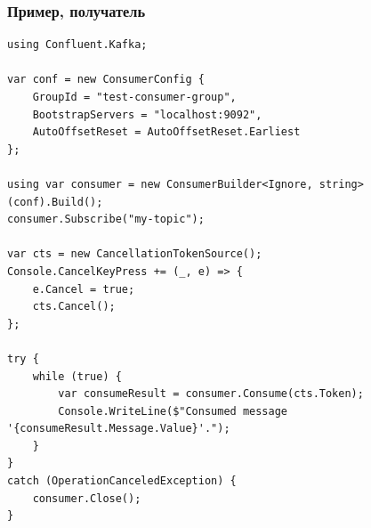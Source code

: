 \documentclass[xetex,mathserif,serif]{beamer}
\begin{document}
    \begin{frame}[fragile]
        \frametitle{Пример, получатель}
        \begin{ssmall}
            \begin{verbatim}
using Confluent.Kafka;

var conf = new ConsumerConfig {
    GroupId = "test-consumer-group",
    BootstrapServers = "localhost:9092",
    AutoOffsetReset = AutoOffsetReset.Earliest
};

using var consumer = new ConsumerBuilder<Ignore, string>(conf).Build();
consumer.Subscribe("my-topic");

var cts = new CancellationTokenSource();
Console.CancelKeyPress += (_, e) => {
    e.Cancel = true;
    cts.Cancel();
};

try {
    while (true) {
        var consumeResult = consumer.Consume(cts.Token);
        Console.WriteLine($"Consumed message '{consumeResult.Message.Value}'.");
    }
}
catch (OperationCanceledException) {
    consumer.Close();
}
            \end{verbatim}
        \end{ssmall}
    \end{frame}
\end{document}
